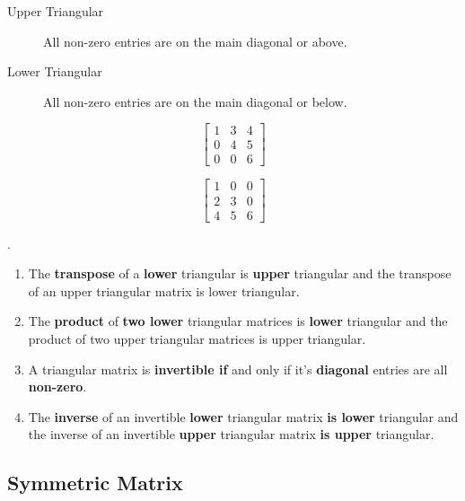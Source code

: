 \begin{definition}
	\begin{description}
		\item[Upper Triangular] All non-zero entries are on the main diagonal or above.
		\item[Lower Triangular] All non-zero entries are on the main diagonal or below.
	\end{description}
\end{definition}

\begin{example}
	\[\begin{bmatrix}  1 & 3 & 4 \\ 0 & 4 & 5 \\ 0 & 0 & 6 \end{bmatrix} \]
\end{example}

\begin{example}
	\[\begin{bmatrix}  1 & 0 & 0 \\ 2 & 3 & 0 \\ 4 & 5 & 6 \end{bmatrix} \]
\end{example}


\begin{theorem}[1.7.1] .

	\begin{enumerate}
		\item The \textbf{transpose} of a \textbf{lower} triangular is \textbf{upper} triangular and the transpose of
			an upper triangular matrix is lower triangular.
		\item The \textbf{product} of  \textbf{two lower} triangular matrices is \textbf{lower} triangular and
			the product of two upper triangular matrices is upper triangular.
		\item A triangular matrix is \textbf{invertible if }and only if it's \textbf{diagonal} entries
			are all \textbf{non-zero}.
		\item The \textbf{inverse} of an invertible \textbf{lower} triangular matrix \textbf{is lower}
			triangular and the inverse of an invertible \textbf{upper} triangular matrix
			\textbf{is upper} triangular.
\end{enumerate}
\end{theorem}

\subsection{Symmetric Matrix}%
\label{sub:symmetric_matrix}

